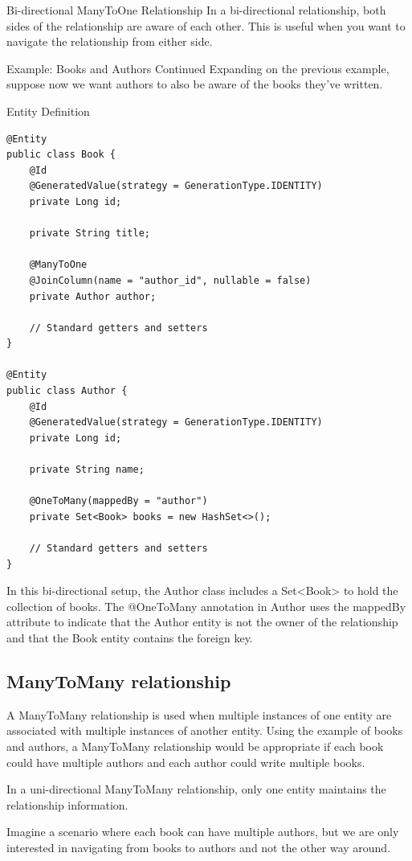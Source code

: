 Bi-directional ManyToOne Relationship
In a bi-directional relationship, both sides of the relationship are aware of each other. This is useful when you want to navigate the relationship from either side.

Example: Books and Authors Continued
Expanding on the previous example, suppose now we want authors to also be aware of the books they've written.

Entity Definition
\begin{lstlisting}
@Entity
public class Book {
    @Id
    @GeneratedValue(strategy = GenerationType.IDENTITY)
    private Long id;

    private String title;

    @ManyToOne
    @JoinColumn(name = "author_id", nullable = false)
    private Author author;

    // Standard getters and setters
}

@Entity
public class Author {
    @Id
    @GeneratedValue(strategy = GenerationType.IDENTITY)
    private Long id;

    private String name;

    @OneToMany(mappedBy = "author")
    private Set<Book> books = new HashSet<>();

    // Standard getters and setters
}
\end{lstlisting}

In this bi-directional setup, the Author class includes a Set<Book> to hold the collection of books. The @OneToMany annotation in Author uses the mappedBy attribute to indicate that the Author entity is not the owner of the relationship and that the Book entity contains the foreign key.

\subsection{ManyToMany relationship}


A ManyToMany relationship is used when multiple instances of one entity are associated with multiple instances of another entity. Using the example of books and authors, a ManyToMany relationship would be appropriate if each book could have multiple authors and each author could write multiple books. 

In a uni-directional ManyToMany relationship, only one entity maintains the relationship information.

Imagine a scenario where each book can have multiple authors, but we are only interested in navigating from books to authors and not the other way around.


